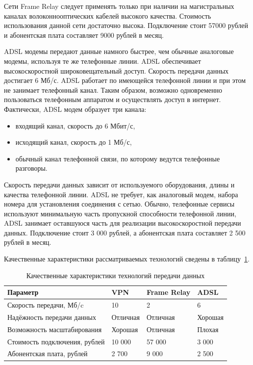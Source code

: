 \documentclass[russian,utf8,emptystyle]{eskdtext}
\begin{document}
Сети Frame Relay следует применять только при наличии на магистральных каналах волоконнооптических кабелей высокого качества. Стоимость использования данной сети достаточно высока. Подключение стоит 57000 рублей и абонентская плата составляет 9000 рублей в месяц.

ADSL модемы передают данные намного быстрее, чем обычные аналоговые модемы, используя те же телефонные линии. ADSL обеспечивает высокоскоростной широковещательный доступ. Скорость передачи данных достигает 6 Мб/с. ADSL работает по имеющейся телефонной
линии и при этом не занимает телефонный канал. Таким образом, возможно одновременно пользоваться телефонным аппаратом и осуществлять доступ в интернет. Фактически, ADSL модем образует три канала:
\begin{itemize}[label=-]
\item входящий канал, скорость до 6 Мбит/с,
\item исходящий канал, скорость до 1 Мб/с,
\item обычный канал телефонной связи, по которому ведутся телефонные разговоры.
\end{itemize}

Скорость передачи данных зависит от используемого оборудования, длины и качества телефонной линии. ADSL не требует, как аналоговый модем, набора номера для установления соединения с сетью. Обычно, телефонные сервисы используют минимальную часть пропускной способности телефонной линии, ADSL занимает оставшуюся часть для реализации высокоскоростной передачи данных. Подключение стоит 3 000 рублей, а абонентская плата составляет 2 500 рублей в месяц.

Качественные характеристики рассматриваемых технологий сведены в таблицу~\ref{tab:connect-1}.

\begin{longtable}{p{7cm}|p{2cm}|p{2cm}|p{2cm}}
\caption{Качественные характеристики технологий передачи данных}
\label{tab:connect-1} \\
Параметр  & VPN & Frame Relay & ADSL \\ 
\hline 
Скорость передачи, Мб/c     & 10 & 2 & 6  \\ 
Надёжность передачи данных & Отличная & Отличная & Хорошая  \\ 
Возможность масштабирования & Хорошая & Отличная & Плохая  \\ 
Стоимость подключения, рублей & 10 000 & 57 000 & 3 000  \\ 
Абонентская плата, рублей & 2 700 & 9 000 & 2 500 \\
\end{longtable}
\end{document}
